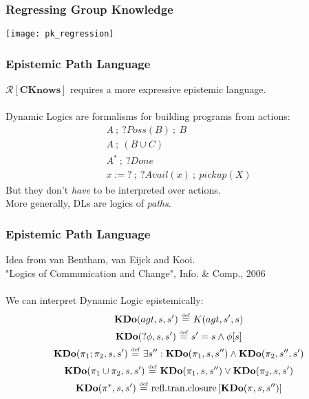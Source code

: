 \documentclass{beamer}
\newcommand{\isdef}{\hbox{$\stackrel{\mbox{\tiny def}}{=}$}}
\newcommand{\Reg}{\mathcal{R}}
\newcommand{\CKnows}{\mathbf{CKnows}}
\begin{document}
\begin{frame}
\frametitle{Regressing Group Knowledge}
\begin{center}
  \texttt{[image: pk\_regression]}
\end{center}
\end{frame}

\begin{frame}
\frametitle{Epistemic Path Language}
$\Reg[\CKnows]$ requires a more expressive epistemic language.
\ \\
\ \\
Dynamic Logics are formalisms for building programs from actions:
\begin{gather*}
A\ ;\ ?Poss(B)\ ;\ B \\
A\ ;\ (B \cup C) \\
A^*\ ;\ ?Done \\
x:=?\ ;\ ?Avail(x)\ ;\ pickup(X)
\end{gather*}
But they don't \emph{have} to be interpreted over actions.\\
More generally, DLs are logics of \emph{paths}.
\end{frame}

\begin{frame}
\frametitle{Epistemic Path Language}
Idea from van Bentham, van Eijck and Kooi.\\
"Logics of Communication and Change", Info. \& Comp., 2006
\ \\
\ \\
We can interpret Dynamic Logic epistemically:
\begin{gather*}
\mathbf{KDo}(agt,s,s')\ \isdef\ K(agt,s',s)\\
\mathbf{KDo}(?\phi,s,s')\ \isdef\ s'=s \wedge \phi[s]\\
\mathbf{KDo}(\pi_1;\pi_2,s,s')\ \isdef\ \exists s'': \mathbf{KDo}(\pi_1,s,s'') \wedge \mathbf{KDo}(\pi_2,s'',s')\\
\mathbf{KDo}(\pi_1\cup\pi_2,s,s')\ \isdef\ \mathbf{KDo}(\pi_1,s,s'') \vee \mathbf{KDo}(\pi_2,s,s')\\
\mathbf{KDo}(\pi^*,s,s')\ \isdef\ \mathrm{refl. tran. closure}\left[\mathbf{KDo}(\pi,s,s'')\right]\\
\end{gather*}
\end{frame}
\end{document}
